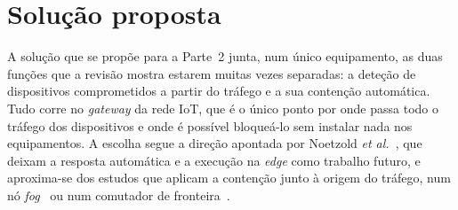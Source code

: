\documentclass[conference,a4paper]{IEEEtran}
\begin{document}
\section{Solução proposta}\label{sec:proposta}
A solução que se propõe para a Parte~2 junta, num único equipamento, as duas funções
que a revisão mostra estarem muitas vezes separadas: a deteção de dispositivos
comprometidos a partir do tráfego e a sua contenção automática. Tudo corre no
\textit{gateway} da rede IoT, que é o único ponto por onde passa todo o tráfego dos
dispositivos e onde é possível bloqueá-lo sem instalar nada nos equipamentos. A escolha
segue a direção apontada por Noetzold \textit{et al.}~\cite{noetzold2026anomaly}, que
deixam a resposta automática e a execução na \textit{edge} como trabalho futuro, e
aproxima-se dos estudos que aplicam a contenção junto à origem do tráfego, num nó
\textit{fog}~\cite{ravi2020semisupervised} ou num comutador de
fronteira~\cite{ramirezmartinez2025p4}.
\end{document}
